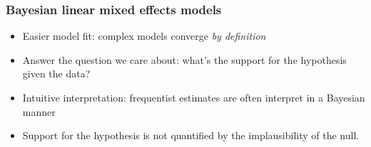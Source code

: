 \begin{frame}
	\frametitle{Bayesian linear mixed effects models}
	
	\begin{itemize}
		\item Easier model fit: complex models converge \textit{by definition}
		\item Answer the question we care about: what's the support for the hypothesis given the data? 
		\item Intuitive interpretation: frequentist estimates are often interpret in a Bayesian manner \cite{nicenboim2016statistical}
		\item Support for the hypothesis is not quantified by the implausibility of the null.

	\end{itemize}

\end{frame}


